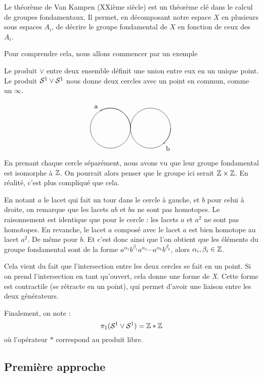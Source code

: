 \documentclass[hidelinks, 10pt]{article}
\begin{document}
Le théorème de Van Kampen (XXième siècle) est un théorème clé dans le calcul de groupes fondamentaux. Il permet, en décomposant notre espace $X$ en plusieurs sous espaces $A_i$, de décrire le groupe fondamental de $X$ en fonction de ceux des $A_i$.

Pour comprendre cela, nous allons commencer par un exemple

\begin{exemple}
Le produit $\vee$ entre deux ensemble définit une union entre eux en un unique point. Le produit $\mathcal{S}^{1}\vee\mathcal{S}^{1}$ nous donne deux cercles avec un point en commun, comme un $\infty$.

$$\begin{tikzpicture}
    \draw (-1,0) circle (1);
    \draw[->] (-1+1,0) arc (0:120:1) node[above left] {a};
    \draw (1,0) circle (1);
    \draw[->] (1+1,0) arc (0:-50:1) node[below right] {b};
\end{tikzpicture}$$ En prenant chaque cercle séparément, nous avons vu que leur groupe fondamental est isomorphe à $\mathbb{Z}$. On pourrait alors penser que le groupe ici serait $\mathbb{Z}\times\mathbb{Z}$. En réalité, c'est plus compliqué que cela.

En notant $a$ le lacet qui fait un tour dans le cercle à gauche, et $b$ pour celui à droite, on remarque que les lacets $ab$ et $ba$ ne sont pas homotopes. Le raisonnement est identique que pour le cercle : les lacets $a$ et $a^2$ ne sont pas homotopes. En revanche, le lacet $a$ composé avec le lacet $a$ est bien homotope au lacet $a^2$. De même pour $b$. Et c'est donc ainsi que l'on obtient que les éléments du groupe fondamental sont de la forme $a^{\alpha_1}b^{\beta_1}a^{\alpha_2}\cdots a^{\alpha_k}b^{\beta_k}$, alors $\alpha_i,\beta_i\in\mathbb{Z}$.

\bigskip Cela vient du fait que l'intersection entre les deux cercles se fait en un point. Si on prend l'intersection en tant qu'ouvert, cela donne une forme de \emph{X}. Cette forme est contractile (se rétracte en un point), qui permet d'avoir une liaison entre les deux générateurs.

Finalement, on note : \[\pi_1(\mathcal{S}^{1}\vee\mathcal{S}^{1})=\mathbb{Z}\ast\mathbb{Z}\]où l'opérateur $\ast$ correspond au produit libre.
\end{exemple}

\subsection{Première approche}
\end{document}
